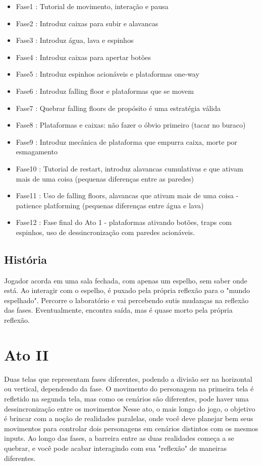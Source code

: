 \documentclass[a4paper, 11pt]{article}
\begin{document}
\begin{itemize}
	\begin{itemize} 
		\item Fase1 : Tutorial de movimento, interação e pausa 
		\item Fase2 : Introduz caixas para subir e alavancas
		\item Fase3 : Introduz água, lava e espinhos
		\item Fase4 : Introduz caixas para apertar botões
		\item Fase5 : Introduz espinhos acionáveis e plataformas one-way
		\item Fase6 : Introduz falling floor e plataformas que se movem
		\item Fase7 : Quebrar falling floors de propósito é uma estratégia válida
		\item Fase8 : Plataformas e caixas: não fazer o óbvio primeiro (tacar no buraco)
		\item Fase9 : Introduz mecânica de plataforma que empurra caixa, morte por esmagamento
		\item Fase10 : Tutorial de restart, introduz alavancas cumulativas e que ativam mais de uma coisa (pequenas diferenças entre as paredes)
		\item Fase11 : Uso de falling floors, alavancas que ativam mais de uma coisa - patience platforming (pequenas diferenças entre água e lava)
		\item Fase12 : Fase final do Ato 1 - plataformas ativando botões, traps com espinhos, uso de dessincronização com paredes acionáveis.
	\end{itemize} 
 
\subsection{História} 
 
	Jogador acorda em uma sala fechada, com apenas um espelho, sem saber onde está. Ao interagir com o espelho, é puxado pela própria reflexão para o "mundo espelhado".
	Percorre o laboratório e vai percebendo sutis mudanças na reflexão das fases. Eventualmente, encontra saída, mas é quase morto pela própria reflexão.

\section{Ato II} 
 
	Duas telas que representam fases diferentes, podendo a divisão ser na horizontal ou vertical, dependendo da fase. 
	O movimento do personagem na primeira tela é refletido na segunda tela, mas como os cenários são diferentes, pode 
	haver uma dessincronização entre os movimentos 
	Nesse ato, o mais longo do jogo, o objetivo é brincar com a noção de realidades paralelas, onde você deve planejar 
	bem seus movimentos para controlar dois personagens em cenários distintos com os mesmos inputs. Ao longo das fases, 
	a barreira entre as duas realidades começa a se quebrar, e você pode acabar interagindo com sua "reflexão" de  
	maneiras diferentes. 
 

\end{itemize}
\end{document}
